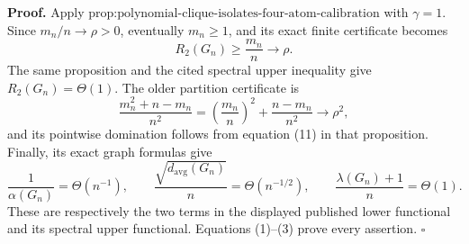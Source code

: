 \textbf{Proof.}
Apply \(\text{prop:polynomial-clique-isolates-four-atom-calibration}\) with \(\gamma=1\).  Since \(m_n/n\to\rho>0\), eventually \(m_n\geq1\), and its exact finite certificate becomes
\[
R_2(G_n)\geq\frac{m_n}{n}\longrightarrow\rho.
\tag{1}
\]
The same proposition and the cited spectral upper inequality give \(R_2(G_n)=\Theta(1)\).  The older partition certificate is
\[
\frac{m_n^2+n-m_n}{n^2}
=\left(\frac{m_n}{n}\right)^2+\frac{n-m_n}{n^2}
\longrightarrow\rho^2,
\tag{2}
\]
and its pointwise domination follows from equation (11) in that proposition.  Finally, its exact graph formulas give
\[
\frac1{\alpha(G_n)}=\Theta(n^{-1}),
\qquad
\frac{\sqrt{d_{\mathrm{avg}}(G_n)}}n=\Theta(n^{-1/2}),
\qquad
\frac{\lambda(G_n)+1}{n}=\Theta(1).
\tag{3}
\]
These are respectively the two terms in the displayed published lower functional and its spectral upper functional.  Equations (1)--(3) prove every assertion. \(\square\)